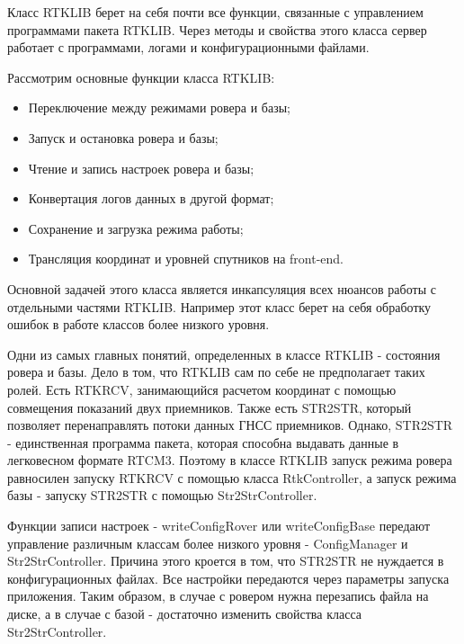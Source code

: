 Класс RTKLIB берет на себя почти все функции, связанные с управлением программами пакета RTKLIB. Через методы и свойства этого класса сервер работает с программами, логами и конфигурационными файлами.

Рассмотрим основные функции класса RTKLIB:

\begin{itemize}
  \item Переключение между режимами ровера и базы;
  \item Запуск и остановка ровера и базы;
  \item Чтение и запись настроек ровера и базы;
  \item Конвертация логов данных в другой формат;
  \item Сохранение и загрузка режима работы;
  \item Трансляция координат и уровней спутников на front-end.
\end{itemize}

Основной задачей этого класса является инкапсуляция всех нюансов работы с отдельными частями RTKLIB. Например этот класс берет на себя обработку ошибок в работе классов более низкого уровня.

Одни из самых главных понятий, определенных в классе RTKLIB - состояния ровера и базы. Дело в том, что RTKLIB сам по себе не предполагает таких ролей. Есть RTKRCV, занимающийся расчетом координат с помощью совмещения показаний двух приемников. Также есть STR2STR, который позволяет перенаправлять потоки данных ГНСС приемников. Однако, STR2STR - единственная программа пакета, которая способна выдавать данные в легковесном формате RTCM3. Поэтому в классе RTKLIB запуск режима ровера равносилен запуску RTKRCV с помощью класса RtkController, а запуск режима базы - запуску STR2STR с помощью Str2StrController.

Функции записи настроек - writeConfigRover или writeConfigBase передают управление различным классам более низкого уровня - ConfigManager и Str2StrController. Причина этого кроется в том, что STR2STR не нуждается в конфигурационных файлах. Все настройки передаются через параметры запуска приложения. Таким образом, в случае с ровером нужна перезапись файла на диске, а в случае с базой - достаточно изменить свойства класса Str2StrController.

